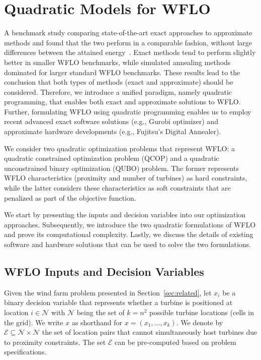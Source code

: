 \documentclass[preprint,12pt]{elsarticle}
\begin{document}
\section{Quadratic Models for WFLO}
\label{sec:QUBO4WFLO}

A benchmark study comparing state-of-the-art exact approaches \cite{Zhang2014} to 
approximate methods and found that the two perform in a comparable fashion, without large differences between
the attained energy~\cite{yang2019simulated}. Exact methods tend to perform slightly better
in smaller WFLO benchmarks, while simulated annealing methods dominated for larger standard WFLO benchmarks. 
These results lead to the conclusion that both types of methods (exact and approximate) should be considered. Therefore, we introduce a unified paradigm, namely quadratic programming, that enables
both exact and approximate solutions to WFLO. Further, formulating WFLO using quadratic programming enables us to employ 
recent advanced exact software solutions (e.g., Gurobi optimizer) and approximate hardware developments 
(e.g., Fujitsu's Digital Annealer).



We consider two
quadratic optimization problems that represent WFLO: a
quadratic constrained optimization problem (QCOP) and 
a quadratic unconstrained binary optimization (QUBO) problem. 
The former represents WFLO characteristics (proximity and number of turbines)
as hard constraints, while the latter considers these characteristics as soft constraints that are penalized as part of the objective function.

We start by presenting the inputs and decision variables into our optimization approaches.
Subsequently, we introduce the two quadratic formulations of WFLO and 
prove its computational complexity. Lastly, we discuss the details of existing
software and hardware solutions that can be used to solve the two formulations. 

\subsection{WFLO Inputs and Decision Variables}
Given the wind farm problem presented in Section~\ref{sec:related},
let $x_i$ be a binary decision variable that represents whether a 
turbine is positioned at location 
$i \in \mathcal{N}$ with $\mathcal{N}$ being the set 
of $k = n^2$ possible turbine locations (cells in the grid). We 
write $x$ as shorthand for $x = (x_1,\ldots, x_k)$. 
We denote by $\mathcal{E} \subseteq \mathcal{N}\times \mathcal{N}$
the set of location pairs that cannot simultaneously host turbines 
due to proximity constraints. The set $\mathcal{E}$ can be pre-computed 
based on problem specifications.
\end{document}
